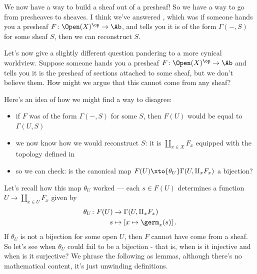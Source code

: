 \documentclass[11pt]{book}
\begin{document}
We now have a way to build a sheaf out of a presheaf! So we have a way to go from presheaves to sheaves. I think we've answered , which was if someone hands you a presheaf $F \colon \Open(X)^\op \to \Ab$, and tells you it is of the form $\Gamma(-,S)$ for some sheaf $S$, then we can reconstruct $S$.

Let's now give a slightly different question pandering to a more cynical worldview. Suppose someone hands you a presheaf $F \colon \Open(X)^\op \to \Ab$ and tells you it is the presheaf of sections attached to some sheaf, but we don't believe them. How might we argue that this cannot come from any sheaf?

Here's an idea of how we might find a way to disagree:
\begin{itemize}
    \item if $F$ was of the form $\Gamma(-,S)$ for some $S$, then $F(U)$ would be equal to $\Gamma(U,S)$
    \item we now know how we would reconstruct $S$: it is $\amalg_{x\in X}F_x$ equipped with the topology defined in 
    \item so we can check: is the canonical map $F(U) \xto{\theta_U} \Gamma(U, \amalg_x F_x)$ a bijection?
\end{itemize}
Let's recall how this map $\theta_U$ worked --- each $s\in F(U)$ determines a function $U \to \amalg_{x\in U}F_x$ given by
\begin{equation}\label{eqn:theta-U}
\begin{aligned}
    \theta_U \colon F(U) &\to \Gamma(U,\amalg_x F_x) \\
    s &\mapsto \left[ x \mapsto \germ_x(s) \right].
\end{aligned}
\end{equation}
If $\theta_U$ is not a bijection for some open $U$, then $F$ cannot have come from a sheaf. So let's see when $\theta_U$ could fail to be a bijection - that is, when is it injective and when is it surjective? We phrase the following as lemmas, although there's no mathematical content, it's just unwinding definitions.
\end{document}
